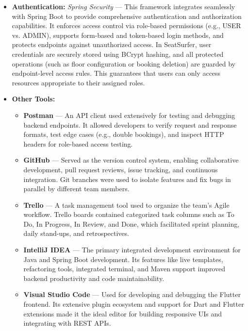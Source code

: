 \documentclass[12pt,a4paper]{report} %
\begin{document}
\begin{itemize}
    \item \textbf{Authentication:} \textit{Spring Security} — This framework integrates seamlessly with Spring Boot to provide comprehensive authentication and authorization capabilities. It enforces access control via role-based permissions (e.g., USER vs. ADMIN), supports form-based and token-based login methods, and protects endpoints against unauthorized access. In SeatSurfer, user credentials are securely stored using BCrypt hashing, and all protected operations (such as floor configuration or booking deletion) are guarded by endpoint-level access rules. This guarantees that users can only access resources appropriate to their assigned roles.

    \item \textbf{Other Tools:}
    \begin{itemize}
        \item \textbf{Postman} — An API client used extensively for testing and debugging backend endpoints. It allowed developers to verify request and response formats, test edge cases (e.g., double bookings), and inspect HTTP headers for role-based access testing.
        
        \item \textbf{GitHub} — Served as the version control system, enabling collaborative development, pull request reviews, issue tracking, and continuous integration. Git branches were used to isolate features and fix bugs in parallel by different team members.
        
        \item \textbf{Trello} — A task management tool used to organize the team's Agile workflow. Trello boards contained categorized task columns such as To Do, In Progress, In Review, and Done, which facilitated sprint planning, daily stand-ups, and retrospectives.
        
        \item \textbf{IntelliJ IDEA} — The primary integrated development environment for Java and Spring Boot development. Its features like live templates, refactoring tools, integrated terminal, and Maven support improved backend productivity and code maintainability.
        
        \item \textbf{Visual Studio Code} — Used for developing and debugging the Flutter frontend. Its extensive plugin ecosystem and support for Dart and Flutter extensions made it the ideal editor for building responsive UIs and integrating with REST APIs.
    \end{itemize}
\end{itemize}
\end{document}
